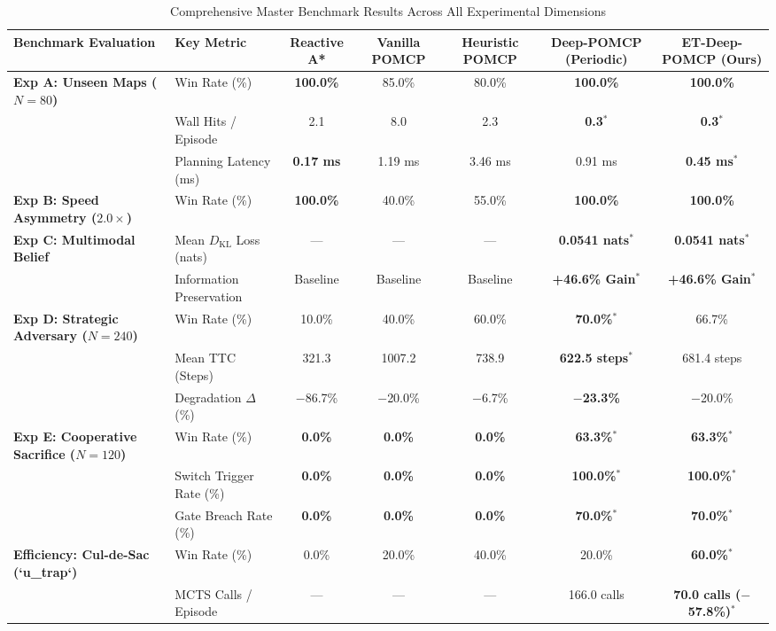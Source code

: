 \documentclass[conference]{IEEEtran}
\begin{document}
\begin{table}[t]
\centering
\caption{Comprehensive Master Benchmark Results Across All Experimental Dimensions}
\label{tab:master_results}
\begin{tabular}{@{}llccccc@{}}
\toprule
\textbf{Benchmark Evaluation} & \textbf{Key Metric} & \textbf{Reactive A*} & \textbf{Vanilla POMCP} & \textbf{Heuristic POMCP} & \textbf{Deep-POMCP (Periodic)} & \textbf{ET-Deep-POMCP (Ours)} \\
\midrule
\textbf{Exp A: Unseen Maps ($N=80$)} & Win Rate (\%) & \textbf{100.0\%} & 85.0\% & 80.0\% & \textbf{100.0\%} & \textbf{100.0\%} \\
& Wall Hits / Episode & 2.1 & 8.0 & 2.3 & \textbf{0.3}$^*$ & \textbf{0.3}$^*$ \\
& Planning Latency (ms) & \textbf{0.17 ms} & 1.19 ms & 3.46 ms & 0.91 ms & \textbf{0.45 ms}$^*$ \\
\midrule
\textbf{Exp B: Speed Asymmetry ($2.0\times$)} & Win Rate (\%) & \textbf{100.0\%} & 40.0\% & 55.0\% & \textbf{100.0\%} & \textbf{100.0\%} \\
\midrule
\textbf{Exp C: Multimodal Belief} & Mean $D_{\text{KL}}$ Loss (nats) & --- & --- & --- & \textbf{0.0541 nats}$^*$ & \textbf{0.0541 nats}$^*$ \\
& Information Preservation & Baseline & Baseline & Baseline & \textbf{+46.6\% Gain}$^*$ & \textbf{+46.6\% Gain}$^*$ \\
\midrule
\textbf{Exp D: Strategic Adversary ($N=240$)} & Win Rate (\%) & 10.0\% & 40.0\% & 60.0\% & \textbf{70.0\%}$^*$ & 66.7\% \\
& Mean TTC (Steps) & 321.3 & 1007.2 & 738.9 & \textbf{622.5 steps}$^*$ & 681.4 steps \\
& Degradation $\Delta$ (\%) & $-$86.7\% & $-$20.0\% & $-$6.7\% & \textbf{$-$23.3\%} & $-$20.0\% \\
\midrule
\textbf{Exp E: Cooperative Sacrifice ($N=120$)} & Win Rate (\%) & \textbf{0.0\%} & \textbf{0.0\%} & \textbf{0.0\%} & \textbf{63.3\%}$^*$ & \textbf{63.3\%}$^*$ \\
& Switch Trigger Rate (\%) & \textbf{0.0\%} & \textbf{0.0\%} & \textbf{0.0\%} & \textbf{100.0\%}$^*$ & \textbf{100.0\%}$^*$ \\
& Gate Breach Rate (\%) & \textbf{0.0\%} & \textbf{0.0\%} & \textbf{0.0\%} & \textbf{70.0\%}$^*$ & \textbf{70.0\%}$^*$ \\
\midrule
\textbf{Efficiency: Cul-de-Sac (`u\_trap`)} & Win Rate (\%) & 0.0\% & 20.0\% & 40.0\% & 20.0\% & \textbf{60.0\%}$^*$ \\
& MCTS Calls / Episode & --- & --- & --- & 166.0 calls & \textbf{70.0 calls ($-$57.8\%)}$^*$ \\
\bottomrule
\end{tabular}
\end{table}
\end{document}
